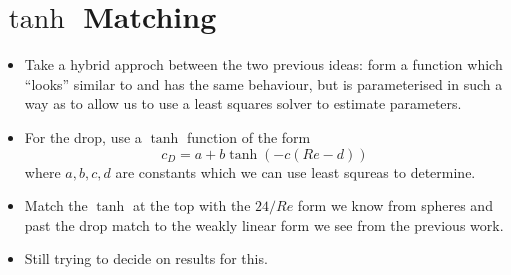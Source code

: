 
\section{$\tanh$ Matching}

\begin{itemize}
\item Take a hybrid approch between the two previous ideas: form a function which ``looks'' similar
to \citet{Morrison2010} and has the same behaviour, but is parameterised in such a way as to allow
us to use a least squares solver to estimate parameters.
\item For the drop, use a $\tanh$ function of the form
\[
c_{D} = a + b \tanh (-c(Re - d))
\]
where $a,b,c,d$ are constants which we can use least squreas to determine.
\item Match the $\tanh$ at the top with the $24/Re$ form we know from spheres and past the drop match
to the weakly linear form we see from the previous work.
\item Still trying to decide on results for this.
\end{itemize}